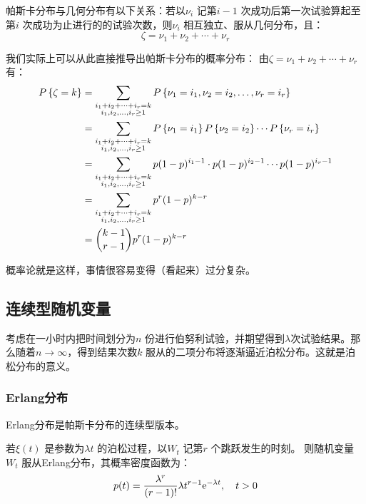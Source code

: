 帕斯卡分布与几何分布有以下关系：若以\(\nu_{i}\) 记第\(i-1\) 次成功后第一次试验算起至第\(i\)
次成功为止进行的的试验次数，则\(\nu_{i}\) 相互独立、服从几何分布，且：
\[
    \zeta = \nu_{1} + \nu_{2} + \cdots + \nu_{r}
\]

我们实际上可以从此直接推导出帕斯卡分布的概率分布：
由\(\zeta = \nu_{1} + \nu_{2} + \cdots + \nu_{r}\) 有：
\begin{align*}
    \P{\zeta=k} &=
    \sum_{\substack{i_{1}+i_{2}+\dots +i_{r}=k
    \\ i_{1},i_{2},\ldots,i_{r}\geq 1}} \P{\nu_{1}=i_{1},
    \nu_{2}=i_{2}, \ldots, \nu_{r}=i_{r}} \\
    &=\sum_{\substack{i_{1}+i_{2}+\dots +i_{r}=k
    \\ i_{1},i_{2},\ldots,i_{r}\geq 1}} P\left\{
    \nu_{1}=i_{1}\right\} \P{ \nu_{2}=i_{2} }
    \cdots \P{ \nu_{r}=i_{r} } \\
    &= \sum_{\substack{i_{1}+i_{2}+\dots +i_{r}=k
    \\ i_{1},i_{2},\ldots,i_{r}\geq 1}} p(1-p)^{i_{1}-1}
    \cdot p(1-p)^{i_{2}-1} \cdots p(1-p)^{i_{r}-1} \\
    &= \sum_{\substack{i_{1}+i_{2}+\dots +i_{r}=k
    \\ i_{1},i_{2},\ldots,i_{r}\geq 1}} p^{r} (1-p)^{k-r} \\
    &= \binom{k-1}{r-1} p^{r} (1-p)^{k-r}
\end{align*}

概率论就是这样，事情很容易变得（看起来）过分复杂。

\subsection{连续型随机变量}
考虑在一小时内把时间划分为\(n\) 份进行伯努利试验，并期望得到\(\lambda\)次试验结果。那么随着\(n
\to \infty\)，得到结果次数\(k\) 服从的二项分布将逐渐逼近泊松分布。这就是泊松分布的意义。

\subsubsection{Erlang分布} Erlang分布是帕斯卡分布的连续型版本。
\begin{definition}[Erlang分布]
    若\(\xi(t)\) 是参数为\(\lambda t\) 的泊松过程，以\(W_{t}\) 记第\(r\) 个跳跃发生的时刻。
    则随机变量\(W_{t}\) 服从Erlang分布，其概率密度函数为：
    \[
        p(t) = \frac{\lambda^{r}}{(r-1)!} \lambda t^{r-1}
        \e^{-\lambda t},
        \quad t>0
    \]
\end{definition}

